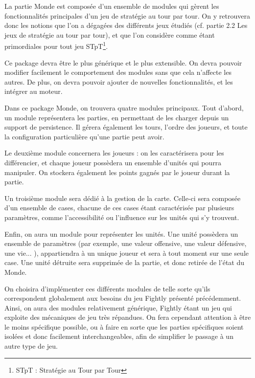 \documentclass[a4paper,10pt]{report}
\begin{document}
        La partie Monde est composée d'un ensemble de modules qui gèrent les fonctionnalités principales d'un jeu de stratégie au tour par tour. On y retrouvera donc les notions que l'on a dégagées des différents jeux étudiés (cf. partie 2.2 Les jeux de stratégie au tour par tour), et que l'on considère comme étant primordiales pour tout jeu STpT\footnote{STpT : Stratégie au Tour par Tour}. 
        
        Ce package devra être le plus générique et le plus extensible. On devra pouvoir modifier facilement le comportement des modules sans que cela n'affecte les autres. De plus, on devra pouvoir ajouter de nouvelles fonctionnalités, et les intégrer au moteur.

        Dans ce package Monde, on trouvera quatre modules principaux. Tout d'abord, un module représentera les parties, en permettant de les charger depuis un support de persistence. Il gérera également les tours, l'ordre des joueurs, et toute la configuration particulière qu'une partie peut avoir. 
        
        Le deuxième module concernera les joueurs : on les caractérisera pour les différencier, et chaque joueur possèdera un ensemble d'unités qui pourra manipuler. On stockera également les points gagnés par le joueur durant la partie. 

        Un troisième module sera dédié à la gestion de la carte. Celle-ci sera composée d'un ensemble de cases, chacune de ces cases étant caractérisée par plusieurs paramètres, comme l'accessibilité ou l'influence sur les unités qui s'y trouvent. 

        Enfin, on aura un module pour représenter les unités. Une unité possèdera un ensemble de paramètres (par exemple, une valeur offensive, une valeur défensive, une vie... ), appartiendra à un unique joueur et sera à tout moment sur une seule case. Une unité détruite sera supprimée de la partie, et donc retirée de l'état du Monde. 
        
        On choisira d'implémenter ces différents modules de telle sorte qu'ils correspondent globalement aux besoins du jeu Fightly présenté précédemment. Ainsi, on aura des modules relativement générique, Fightly étant un jeu qui exploite des mécaniques de jeu très répandues. On fera cependant attention à être le moins spécifique possible, ou à faire en sorte que les parties spécifiques soient isolées et donc facilement interchangeables, afin de simplifier le passage à un autre type de jeu. 
        
\end{document}
